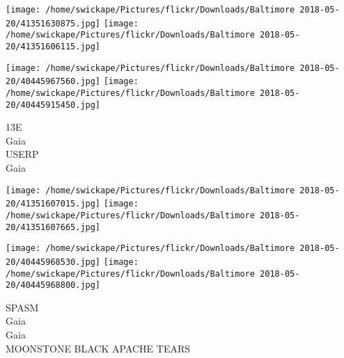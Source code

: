 \documentclass[10pt,letterpaper]{article}
\begin{document}
\texttt{[image: /home/swickape/Pictures/flickr/Downloads/Baltimore 2018-05-20/41351630875.jpg]}
\texttt{[image: /home/swickape/Pictures/flickr/Downloads/Baltimore 2018-05-20/41351606115.jpg]}

\texttt{[image: /home/swickape/Pictures/flickr/Downloads/Baltimore 2018-05-20/40445967560.jpg]}
\texttt{[image: /home/swickape/Pictures/flickr/Downloads/Baltimore 2018-05-20/40445915450.jpg]}

13E\\
Gaia\\
USERP\\
Gaia\\
\pagebreak

\texttt{[image: /home/swickape/Pictures/flickr/Downloads/Baltimore 2018-05-20/41351607015.jpg]}
\texttt{[image: /home/swickape/Pictures/flickr/Downloads/Baltimore 2018-05-20/41351607665.jpg]}

\texttt{[image: /home/swickape/Pictures/flickr/Downloads/Baltimore 2018-05-20/40445968530.jpg]}
\texttt{[image: /home/swickape/Pictures/flickr/Downloads/Baltimore 2018-05-20/40445968800.jpg]}

SPASM\\
Gaia\\
Gaia\\
MOONSTONE BLACK APACHE TEARS\\
\pagebreak
\end{document}
